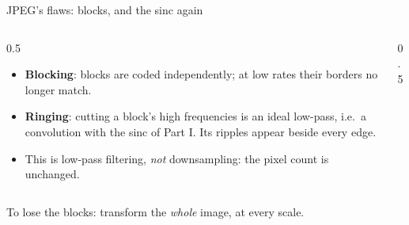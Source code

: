 \documentclass[aspectratio=169]{beamer}
\begin{document}
\begin{frame}{JPEG's flaws: blocks, and the sinc again}
  \begin{columns}[T]
    \begin{column}{0.5\textwidth}
      \begin{itemize}
        \item \textbf{Blocking}: blocks are coded independently; at low rates their borders no longer match.
        \item \textbf{Ringing}: cutting a block's high frequencies is an ideal low-pass, i.e.\ a convolution with the \alert{sinc} of Part I. Its ripples appear beside every edge.
        \item This is low-pass filtering, \emph{not} downsampling: the pixel count is unchanged.
      \end{itemize}
    \end{column}
    \begin{column}{0.5\textwidth}
      \begin{center}
      \end{center}
    \end{column}
  \end{columns}
  \medskip
  To lose the blocks: transform the \emph{whole} image, at every scale.
\end{frame}
\end{document}
